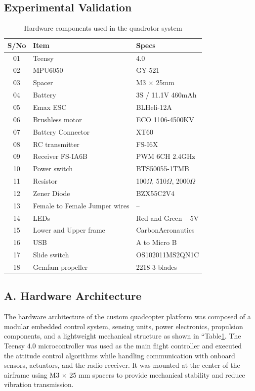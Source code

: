 \begin{small}
\begin{enumerate}
\section{Experimental Validation}

\begin{table}[h]
\centering
\caption{Hardware components used in the quadrotor system}
\label{tab:hardware}
\begin{tabular}{|c|l|l|}
\hline
S/No & Item & Specs \\ 
\hline
01 & Teensy & 4.0 \\ 
02 & MPU6050 & GY-521 \\ 
03 & Spacer & M3 $\times$ 25mm \\ 
04 & Battery & 3S / 11.1V 460mAh \\ 
05 & Emax ESC & BLHeli-12A \\ 
06 & Brushless motor & ECO 1106-4500KV \\ 
07 & Battery Connector & XT60 \\ 
08 & RC transmitter & FS-I6X \\ 
09 & Receiver FS-IA6B & PWM 6CH 2.4GHz \\ 
10 & Power switch & BTS50055-1TMB \\ 
11 & Resistor & 100$\Omega$, 510$\Omega$, 2000$\Omega$ \\ 
12 & Zener Diode & BZX55C2V4 \\ 
13 & Female to Female Jumper wires & -- \\ 
14 & LEDs & Red and Green -- 5V \\ 
15 & Lower and Upper frame & CarbonAeronautics \\ 
16 & USB & A to Micro B \\ 
17 & Slide switch & OS102011MS2QN1C \\ 
18 & Gemfam propeller & 2218 3-blades \\ 
\hline
\end{tabular}
\end{table}

\subsection*{A. Hardware Architecture}

The hardware architecture of the custom quadcopter platform was composed of a modular embedded control system, sensing units, power electronics, propulsion components, and a lightweight mechanical structure as shown in ``Table\ref{tab:hardware}. The Teensy 4.0 microcontroller was used as the main flight controller and executed the attitude control algorithms while handling communication with onboard sensors, actuators, and the radio receiver. It was mounted at the center of the airframe using M3 $\times$ 25 mm spacers to provide mechanical stability and reduce vibration transmission.


\end{enumerate}
\end{small}
